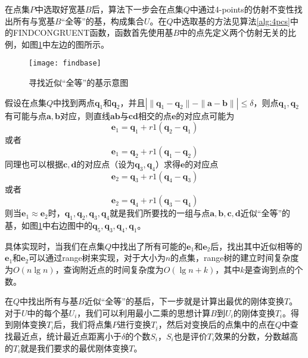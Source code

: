 在点集$P$中选取好宽基$B$后，算法下一步会在点集$Q$中通过4-points的仿射不变性找出所有与宽基$B$“全等”的基，构成集合$U$。在$Q$中选取基的方法见算法\ref{alg:4pcs}中的FINDCONGRUENT函数，函数首先使用基$B$中的点先定义两个仿射无关的比例，如图\ref{fig:findbase}中左边的图所示。
\begin{figure}[ht]
  \centering
  \texttt{[image: findbase]}
  \caption{寻找近似“全等”的基示意图}
  \label{fig:findbase}
\end{figure}
假设在点集$Q$中找到两点$\mathbf{q}_1$和$\mathbf{q}_2$，并且$\left|\parallel \mathbf{q}_1-\mathbf{q}_2\parallel - \parallel \mathbf{a}-\mathbf{b}\parallel\right| \leq \delta$，则点$\mathbf{q}_1,\mathbf{q}_2$有可能与点$\mathbf{a}, \mathbf{b}$对应，则直线$\mathbf{a}\mathbf{b}$与$\mathbf{c}\mathbf{d}$相交的点$\mathbf{e}$的对应点可能为
\begin{equation}
  \mathbf{e}_1 = \mathbf{q}_1 + r1(\mathbf{q}_2-\mathbf{q}_1)
\end{equation}
或者
\begin{equation}
  \mathbf{e}_1 = \mathbf{q}_2 + r1(\mathbf{q}_1-\mathbf{q}_2)
\end{equation}
同理也可以根据$\mathbf{c},\mathbf{d}$的对应点（设为$\mathbf{q}_3, \mathbf{q}_4$）求得$\mathbf{e}$的对应点
\begin{equation}
  \mathbf{e}_2 = \mathbf{q}_3 + r1(\mathbf{q}_4-\mathbf{q}_3)
\end{equation}
或者
\begin{equation}
  \mathbf{e}_2 = \mathbf{q}_4 + r1(\mathbf{q}_3-\mathbf{q}_4)
\end{equation}
则当$\mathbf{e}_1\approx \mathbf{e}_2$时，$\mathbf{q}_1,\mathbf{q}_2,\mathbf{q}_3,\mathbf{q}_4$就是我们所要找的一组与点$\mathbf{a},\mathbf{b},\mathbf{c},\mathbf{d}$近似“全等”的基，如图\ref{fig:findbase}中右边图中的$\mathbf{q}_5,\mathbf{q}_3,\mathbf{q}_4,\mathbf{q}_1$。

具体实现时，当我们在点集$Q$中找出了所有可能的$\mathbf{e}_1$和$\mathbf{e}_2$后，找出其中近似相等的$\mathbf{e}_1$和$\mathbf{e}_2$可以通过range树\cite{arya1998optimal}来实现，对于大小为$n$的点集，range树的建立时间复杂度为$O(n\lg n)$，查询附近点的时间复杂度为$O(\lg n + k)$，其中$k$是查询到点的个数。

在$Q$中找出所有与基$B$近似“全等”的基后，下一步就是计算出最优的刚体变换$T$。对于$U$中的每个基$U_i$，我们可以利用最小二乘\cite{horn1987closed}的思想计算$B$到$U_i$的刚体变换$T_i$。得到刚体变换$T_i$后，我们将点集$P$进行变换$T_i$，然后对变换后的点集中的点在$Q$中查找最近点，统计最近点距离小于$\delta$的个数$S_i$，$S_i$也是评价$T_i$效果的分数，分数越高的$T_i$就是我们要求的最优刚体变换$T$。

